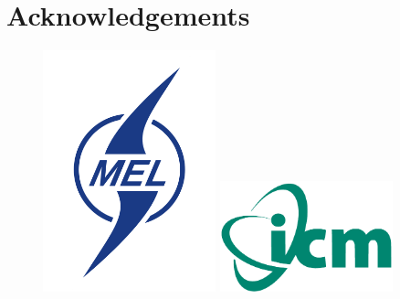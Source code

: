 \section*{Acknowledgements}

\begin{figure}[h!]%
\includegraphics[width=5cm]{logo_organiz/logo_meil.png}%
\includegraphics[width=5cm]{logo_organiz/logoICM}%
\caption{}%
\label{}%
\end{figure}